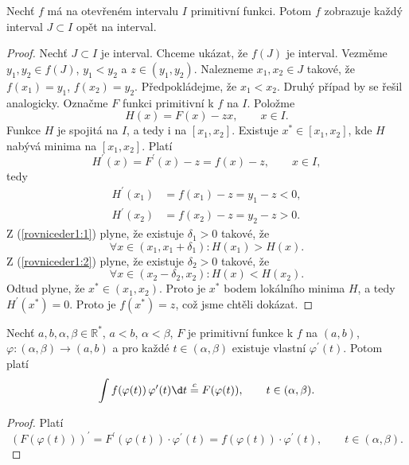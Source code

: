 \begin{veta} \label{veta8.5}
Nechť $f$ má na otevřeném intervalu $I$ primitivní funkci. Potom $f$ zobrazuje každý interval $J \subset I$ opět na interval.
\end{veta}

\begin{proof}
    Nechť $J\subset I$ je interval. Chceme ukázat, že $f(J)$ je interval.
    Vezměme $y_1, y_2 \in f(J)$, $y_1 < y_2$ a $z\in (y_1,y_2)$. Nalezneme
    $x_1, x_2 \in J$ takové, že $f(x_1) = y_1$, $f(x_2)=y_2$. Předpokládejme, že
    $x_1 < x_2$. Druhý případ by se řešil analogicky. Označme $F$ funkci primitivní k $f$ na $I$.
    Položme
    $$
        H(x) = F(x)-zx, \qquad x \in I.
    $$
    Funkce $H$ je spojitá na $I$, a tedy i na $[x_1,x_2]$. Existuje $x^*\in [x_1,x_2]$, kde
    $H$ nabývá minima na $[x_1,x_2]$. Platí
    $$
    H^\prime(x) = F^\prime(x)-z=f(x)-z, \qquad x \in I,
    $$
    tedy
    \begin{align}
    H^\prime(x_1) &= f(x_1)-z = y_1 - z < 0,\label{rovniceder1:1}\\
    H^\prime(x_2) &= f(x_2)-z = y_2 - z > 0.\label{rovniceder1:2}
    \end{align}
    Z (\ref{rovniceder1:1}) plyne, že existuje $\delta_1 > 0$ takové, že
    $$
        \forall x \in (x_1, x_1+\delta_1): H(x_1)>H(x).
    $$
    Z (\ref{rovniceder1:2}) plyne, že existuje $\delta_2>0$ takové, že
    $$
        \forall x \in (x_2-\delta_2, x_2):H(x)<H(x_2).
    $$
    Odtud plyne, že $x^* \in (x_1,x_2)$. Proto je $x^*$ bodem lokálního minima $H$,
    a tedy $H^\prime(x^*)=0$. Proto je $f(x^*)=z$, což jsme chtěli dokázat.
\end{proof}

\begin{veta} \label{veta8.6}
Nechť $a,b,\alpha,\beta \in \mathbb{R}^*$, $a<b$, $\alpha<\beta$, $F$ je primitivní funkce k $f$ na $(a,b)$,
$\varphi : (\alpha,\beta) \to (a,b)$ a pro každé $t \in \left(\alpha, \beta \right ) $ existuje vlastní
$\varphi^\prime(t)$. Potom platí
\[
\int f(\varphi(t))\, \varphi'(t)\d t \stackrel{c}{=} F(\varphi(t)), \qquad t \in (\alpha,\beta).
\]
\end{veta}

\begin{proof}
	Platí
	$$
	    (F(\varphi(t)))^\prime = F^\prime(\varphi(t))\cdot \varphi^\prime(t) = f(\varphi(t))\cdot \varphi^\prime(t), \qquad t \in (\alpha, \beta).
	$$
\end{proof}

